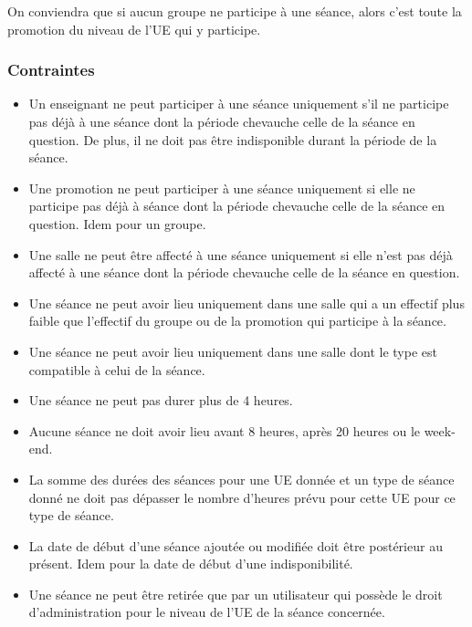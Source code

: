 \documentclass{article}
\begin{document}
On conviendra que si aucun groupe ne participe à une séance, alors c'est toute la promotion du niveau de l'UE qui y participe.

\newpage
\subsubsection{Contraintes}

\begin{itemize}
\item Un enseignant ne peut participer à une séance uniquement s'il ne participe pas déjà à une séance dont la période chevauche celle de la séance en question. De plus, il ne doit pas être indisponible durant la période de la séance.

\item Une promotion ne peut participer à une séance uniquement si elle ne participe pas déjà à séance dont la période chevauche celle de la séance en question. Idem pour un groupe.

\item Une salle ne peut être affecté à une séance uniquement si elle n'est pas déjà affecté à une séance dont la période chevauche celle de la séance en question.

\item Une séance ne peut avoir lieu uniquement dans une salle qui a un effectif plus faible que l'effectif du groupe ou de la promotion qui participe à la séance.

\item Une séance ne peut avoir lieu uniquement dans une salle dont le type est compatible à celui de la séance.

\item Une séance ne peut pas durer plus de 4 heures.

\item Aucune séance ne doit avoir lieu avant 8 heures, après 20 heures ou le week-end.

\item La somme des durées des séances pour une UE donnée et un type de séance donné ne doit pas dépasser le nombre d'heures prévu pour cette UE pour ce type de séance.

\item La date de début d'une séance ajoutée ou modifiée doit être postérieur au présent. Idem pour la date de début d'une indisponibilité.

\item Une séance ne peut être retirée que par un utilisateur qui possède le droit d'administration pour le niveau de l'UE de la séance concernée.


\end{itemize}
\end{document}
